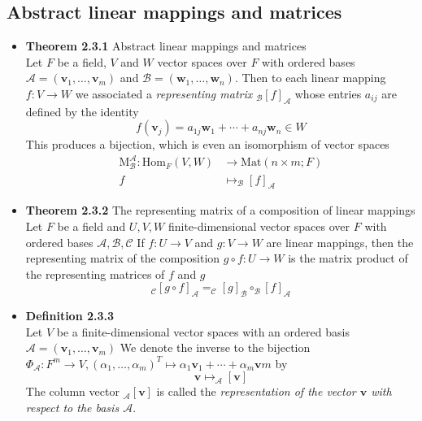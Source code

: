 \documentclass[11pt,a4paper]{article}
\begin{document}
\subsection{Abstract linear mappings and matrices}

\begin{itemize}

    \item \textbf{Theorem 2.3.1} Abstract linear mappings and matrices \\
        Let $F$ be a field, $V$ and $W$ vector spaces over $F$ with ordered bases
        $\mathcal{A} = (\textbf{v}_1, \ldots, \textbf{v}_m)$ and
        $\mathcal{B} = (\textbf{w}_1, \ldots, \textbf{w}_n)$.
        Then to each linear mapping $f : V \to W$ we associated a \emph{representing matrix}
        $_\mathcal{B}{[f]}_\mathcal{A}$ whose entries $a_{ij}$ are defined by the identity
        \[
            f(\textbf{v}_j) = a_{1j}\textbf{w}_1 + \cdots + a_{nj}\textbf{w}_n \in W
        \]
        This produces a bijection, which is even an isomorphism of vector spaces
        \begin{align*}{}
            \mathrm{M}_\mathcal{B}^\mathcal{A} : \mathrm{Hom}_F(V,W) &\to
            \mathrm{Mat}(n \times m; F) \\
            f &\mapsto _\mathcal{B}{[f]}_\mathcal{A}
        \end{align*}

    \item \textbf{Theorem 2.3.2} The representing matrix of a composition of linear mappings \\
        Let $F$ be a field and $U, V, W$ finite-dimensional vector spaces over $F$ with ordered
        bases $\mathcal{A, B, C}$
        If $f : U \to V$ and $g : V \to W$ are linear mappings,
        then the representing  matrix of the composition
        $g \circ f : U \to W$
        is the matrix product of the representing matrices of $f$ and $g$
        \[
            _\mathcal{C}{[g \circ f]}_\mathcal{A} = _\mathcal{C}{[g]}_\mathcal{B} \circ
            _\mathcal{B}{[f]}_\mathcal{A}
        \]

    \item \textbf{Definition 2.3.3} \\
        Let $V$ be a finite-dimensional vector spaces with an ordered basis
        $\mathcal{A} = (\textbf{v}_1, \ldots, \textbf{v}_m)$
        We denote the inverse to the bijection
        $\Phi_\mathcal{A} : F^m \to V, {(\alpha_1, \ldots, \alpha_m)}^T \mapsto
        \alpha_1\textbf{v}_1 + \cdots + \alpha_m\textbf{v}m$ by
        \[
            \textbf{v} \mapsto _\mathcal{A}[\textbf{v}]
        \]
        The column vector $_\mathcal{A}[\textbf{v}]$ is called the \emph{representation of the
        vector $\textbf{v}$ with respect to the basis $\mathcal{A}$}.


\end{itemize}
\end{document}
